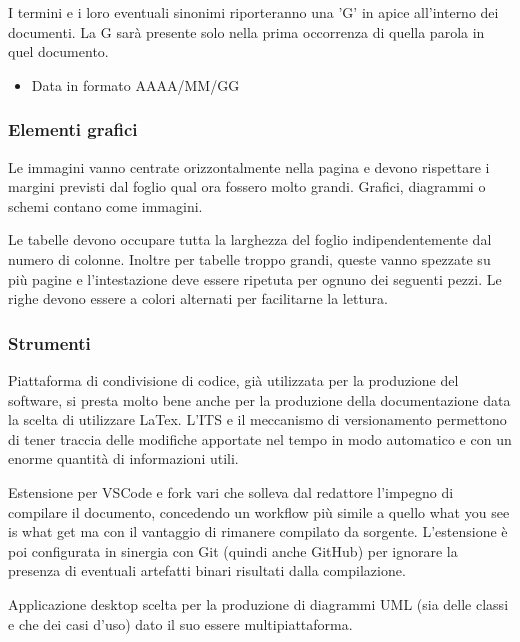     I termini e i loro eventuali sinonimi riporteranno una 'G' in apice all'interno dei documenti. La G sarà
    presente solo nella prima occorrenza di quella parola in quel documento.

    \begin{itemize}
    \item Data in formato AAAA/MM/GG
    \end{itemize}

\subsubsection{Elementi grafici}

    Le immagini vanno centrate orizzontalmente nella pagina e devono rispettare i margini previsti dal foglio qual ora
    fossero molto grandi.
    Grafici, diagrammi o schemi contano come immagini.

    Le tabelle devono occupare tutta la larghezza del foglio indipendentemente dal numero di colonne.
    Inoltre per tabelle troppo grandi, queste vanno spezzate su più pagine e l'intestazione deve essere ripetuta
    per ognuno dei seguenti pezzi.
    Le righe devono essere a colori alternati per facilitarne la lettura.

\subsubsection{Strumenti}

    Piattaforma di condivisione di codice, già utilizzata per la produzione del software, si presta
    molto bene anche per la produzione della documentazione data la scelta di utilizzare LaTex.
    L'ITS e il meccanismo di versionamento permettono di tener traccia delle modifiche apportate nel tempo
    in modo automatico e con un enorme quantità di informazioni utili.

    Estensione per VSCode e fork vari che solleva dal redattore l'impegno di compilare il documento, concedendo un workflow più simile
    a quello what you see is what get ma con il vantaggio di rimanere compilato da sorgente.
    L'estensione è poi configurata in sinergia con Git (quindi anche GitHub) per ignorare la presenza di eventuali artefatti binari
    risultati dalla compilazione.

    Applicazione desktop scelta per la produzione di diagrammi UML (sia delle classi e che dei casi d'uso) dato il suo essere
    multipiattaforma.
